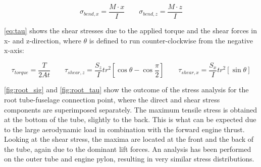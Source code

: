 \begin{equation}
\label{eq:sig_bend}
    {\sigma _{bend,x}} = \frac{{M \cdot x}}{I}
    \qquad
    {\sigma _{bend,z}} = \frac{{M \cdot z}}{I}
\end{equation}

\autoref{eq:tau} shows the shear stresses due to the applied torque and the shear forces in x- and z-direction, where $\theta$ is defined to run counter-clockwise from the negative x-axis:

\begin{equation}
\label{eq:tau}
    {\tau _{torque}} = \frac{T}{{2At}}
    \qquad
    {\tau _{shear,z}} = \frac{{{S_z}}}{{{I}}}t{r^2}\left[ {\cos \theta  - \cos \frac{\pi }{2}} \right]
    \qquad
    {\tau _{shear,x}} = \frac{{{S_x}}}{{{I}}}t{r^2}\left[ {\sin \theta } \right]
\end{equation}

\autoref{fig:root_sig} and \autoref{fig:root_tau} show the outcome of the stress analysis for the root tube-fuselage connection point, where the direct and shear stress components are superimposed separately. The maximum tensile stress is obtained at the bottom of the tube, slightly to the back. This is what can be expected due to the large aerodynamic load in combination with the forward engine thrust. Looking at the shear stress, the maxima are located at the front and the back of the tube, again due to the dominant lift forces. An analysis has been performed on the outer tube and engine pylon, resulting in very similar stress distributions.

